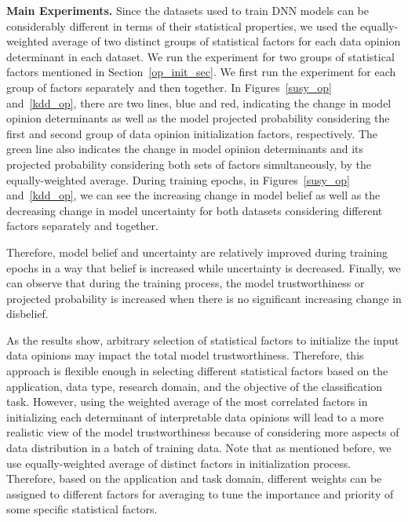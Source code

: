 \noindent \textbf{Main Experiments.} Since the datasets used to train DNN models can be considerably different in terms of their statistical properties, we used the equally-weighted average of two distinct groups of statistical factors for each data opinion determinant in each dataset. We run the experiment for two groups of statistical factors mentioned in Section~\ref{op_init_sec}. 
We first run the experiment for each group of factors separately and then together. In Figures~\ref{susy_op} and~\ref{kdd_op}, there are two lines, blue and red, indicating the change in model opinion determinants as well as the model projected probability considering the first and second group of data opinion initialization factors, respectively. The green line also indicates the change in model opinion determinants and its projected probability considering both sets of factors simultaneously, by the equally-weighted average. During training epochs, in Figures~\ref{susy_op} and~\ref{kdd_op}, we can see the increasing change in model belief as well as the decreasing change in model uncertainty for both datasets considering different factors separately and together.{\color{blue} Therefore, model belief and uncertainty are relatively improved during training epochs in a way that belief is increased while uncertainty is decreased. Finally, we can observe that during the training process, the model trustworthiness or projected probability is increased when there is no significant increasing change in disbelief. 

As the results show, arbitrary selection of statistical factors to initialize the input data opinions may impact the total model trustworthiness. Therefore, this approach is flexible enough in selecting different statistical factors based on the application, data type, research domain, and the objective of the classification task. However, using the weighted average of the most correlated factors in initializing each determinant of interpretable data opinions will lead to a more realistic view of the model trustworthiness because of considering more aspects of data distribution in a batch of training data. Note that as mentioned before, we use equally-weighted average of distinct factors in initialization process. Therefore, based on the application and task domain, different weights can be assigned to different factors for averaging to tune the importance and priority of some specific statistical factors.}

